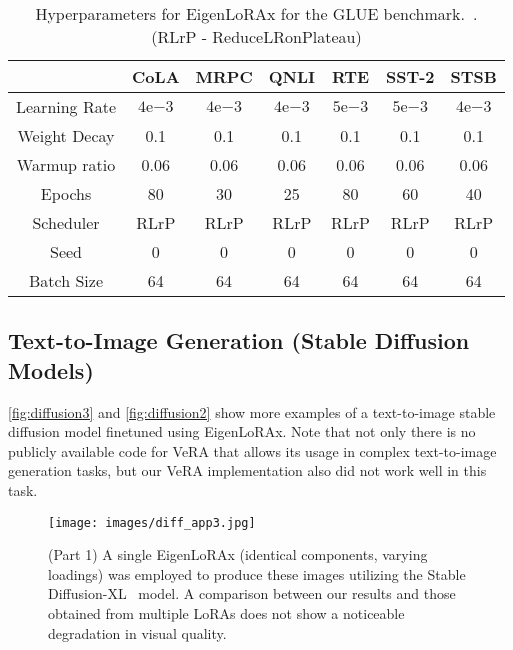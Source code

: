\begin{table}[h]
  \centering
    \caption{Hyperparameters for EigenLoRAx for the GLUE benchmark.~\citep{glue}.\\ (RLrP - ReduceLRonPlateau)} 
  \begin{tabular}{ccccccc}
    \toprule
    & CoLA & MRPC & QNLI & RTE & SST-2 & STSB \\
    \midrule
    Learning Rate            & $4\mathrm{e}{-3}$
 & $4\mathrm{e}{-3}$ & $4\mathrm{e}{-3}$ & $5\mathrm{e}{-3}$ & $5\mathrm{e}{-3}$ & $4\mathrm{e}{-3}$ \\ 
    Weight Decay            & 0.1      & 0.1      & 0.1      & 0.1      & 0.1      & 0.1      \\ 
    Warmup ratio  & 0.06     & 0.06     & 0.06     & 0.06     & 0.06     & 0.06     \\ 
    Epochs        & 80       & 30       & 25       & 80       & 60       & 40       \\ 
    Scheduler     & RLrP & RLrP   & RLrP   & RLrP & RLrP   & RLrP   \\
    Seed          & 0        & 0        & 0        & 0        & 0        & 0        \\
    Batch Size          & 64       & 64        & 64        & 64        & 64        & 64\\ 
    \bottomrule
  \end{tabular}
  \label{tab:appendix_glue_elora_hyp}
\end{table}
\FloatBarrier

\FloatBarrier
\subsection{Text-to-Image Generation (Stable Diffusion Models)}\label{appendix:diffusion}
\autoref{fig:diffusion3} and \autoref{fig:diffusion2} show more examples of a text-to-image stable diffusion model finetuned using EigenLoRAx. Note that not only there is no publicly available code for VeRA that allows its usage in complex text-to-image generation tasks, but our VeRA implementation also did not work well in this task.
\begin{figure}[htb]
\begin{center}
\texttt{[image: images/diff\_app3.jpg]}
\end{center}
\caption{(Part 1) A single EigenLoRAx (identical components, varying loadings) was employed to produce these images utilizing the Stable Diffusion-XL~\cite{sdxl} model. A comparison between our results and those obtained from multiple LoRAs does not show a noticeable degradation in visual quality.}
\label{fig:diffusion3}
\end{figure}

